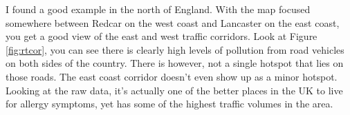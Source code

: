 I found a good example in the north of England. With the map focused somewhere between Redcar on the west coast and Lancaster on the east coast, you get a good view of the east and west traffic corridors. Look at Figure \ref{fig:rtcor}, you can see there is clearly high levels of pollution from road vehicles on both sides of the country. There is however, not a single hotspot that lies on those roads. The east coast corridor doesn't even show up as a minor hotspot. Looking at the raw data, it's actually one of the better places in the UK to live for allergy symptoms, yet has some of the highest traffic volumes in the area.\\